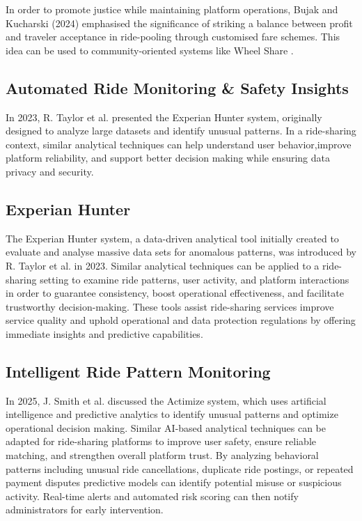 In order to promote justice while maintaining platform operations, Bujak and Kucharski (2024) emphasised the significance of striking a balance between profit and traveler acceptance in ride-pooling through customised fare schemes. This idea can be used to community-oriented systems like Wheel Share
\cite{bujak2024}.

\subsection{Automated Ride Monitoring & Safety Insights}
In 2023, R. Taylor et al. presented the Experian Hunter system, originally designed to analyze large datasets and identify unusual patterns. In a ride-sharing context, similar analytical techniques can help understand user behavior,improve platform reliability, and support better decision making while ensuring data privacy and security\cite{taylor2023}.


\subsection{Experian Hunter}
The Experian Hunter system, a data-driven analytical tool initially created to evaluate and analyse massive data sets for anomalous patterns, was introduced by R. Taylor et al. in 2023. Similar analytical techniques can be applied to a ride-sharing setting to examine ride patterns, user activity, and platform interactions in order to guarantee consistency, boost operational effectiveness, and facilitate trustworthy decision-making\cite{taylor2023}. These tools assist ride-sharing services improve service quality and uphold operational and data protection regulations by offering immediate insights and predictive capabilities. 


\subsection{Intelligent Ride Pattern Monitoring}
In 2025, J. Smith et al. discussed the Actimize system, which uses artificial intelligence and predictive analytics to identify unusual patterns and optimize operational decision making\cite{smith2025}. Similar AI-based analytical techniques can be adapted for ride-sharing platforms to improve user safety, ensure reliable matching, and strengthen overall platform trust.
By analyzing behavioral patterns including unusual ride cancellations, duplicate ride postings, or repeated payment disputes predictive models can identify potential misuse or suspicious activity. Real-time alerts and automated risk scoring can then notify administrators for early intervention.

